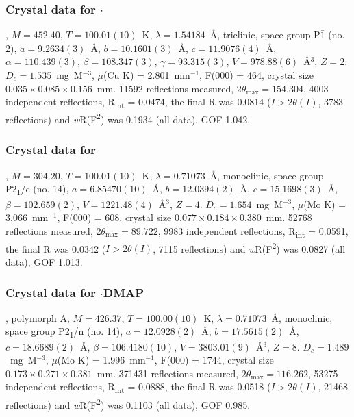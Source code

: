 \begin{refsection}
\subsubsection{Crystal data for \texorpdfstring{$\cdot$}{C23 H23 N3 O2 Se}}
, $M=452.40$, $T=100.01(10)$~K, $\lambda=1.54184$~\AA, triclinic, space group P$\bar{1}$ (no. 2), $a = 9.2634(3)$~\AA, $b = 10.1601(3)$~\AA, $c = 11.9076(4)$~\AA, $\alpha = 110.439(3)$\degree, $\beta = 108.347(3)$\degree, $\gamma = 93.315(3)$\degree, $V = 978.88(6)$~\AA$^{3}$, $Z = 2$. $D_{c}= 1.535$~mg~M$^{-3}$, $\mu$(Cu K\a) = 2.801~mm$^{-1}$, F(000) = 464, crystal size $0.035 \times 0.085 \times 0.156$~mm. 11592 reflections measured, $2\theta_{\mathrm{max}}=154.304$\degree, 4003 independent reflections, R\textsubscript{int} = 0.0474, the final R was 0.0814 ($I > 2\theta(I)$, 3783 reflections) and \emph{w}R(F\textsuperscript{2}) was 0.1934 (all data), GOF 1.042.

\subsubsection{Crystal data for \texorpdfstring{}{C14 H11 N O2 Se}}
, $M=304.20$, $T=100.01(10)$~K, $\lambda=0.71073$~\AA, monoclinic, space group P2\textsubscript{1}/c (no. 14), $a = 6.85470(10)$~\AA, $b = 12.0394(2)$~\AA, $c = 15.1698(3)$~\AA, $\beta = 102.659(2)$\degree, $V = 1221.48(4)$~\AA$^{3}$, $Z = 4$. $D_{c}= 1.654$~mg~M$^{-3}$, $\mu$(Mo K\a) = 3.066~mm$^{-1}$, F(000) = 608, crystal size $0.077 \times 0.184 \times 0.380$~mm. 52768 reflections measured, $2\theta_{\mathrm{max}}=89.722$\degree, 9983 independent reflections, R\textsubscript{int} = 0.0591, the final R was 0.0342 ($I > 2\theta(I)$, 7115 reflections) and \emph{w}R(F\textsuperscript{2}) was 0.0827 (all data), GOF 1.013.

\subsubsection{Crystal data for \texorpdfstring{$\cdot$DMAP}{C21 H21 N3 O2 Se}}
, polymorph A, $M=426.37$, $T=100.00(10)$~K, $\lambda=0.71073$~\AA, monoclinic, space group P2\textsubscript{1}/n (no. 14), $a = 12.0928(2)$~\AA, $b = 17.5615(2)$~\AA, $c = 18.6689(2)$~\AA, $\beta = 106.4180(10)$\degree, $V = 3803.01(9)$~\AA$^{3}$, $Z = 8$. $D_{c}= 1.489$~mg~M$^{-3}$, $\mu$(Mo K\a) = 1.996~mm$^{-1}$, F(000) = 1744, crystal size $0.173 \times 0.271 \times 0.381$~mm. 371431 reflections measured, $2\theta_{\mathrm{max}}=116.262$\degree, 53275 independent reflections, R\textsubscript{int} = 0.0888, the final R was 0.0518 ($I > 2\theta(I)$, 21468 reflections) and \emph{w}R(F\textsuperscript{2}) was 0.1103 (all data), GOF 0.985.


\end{refsection}
